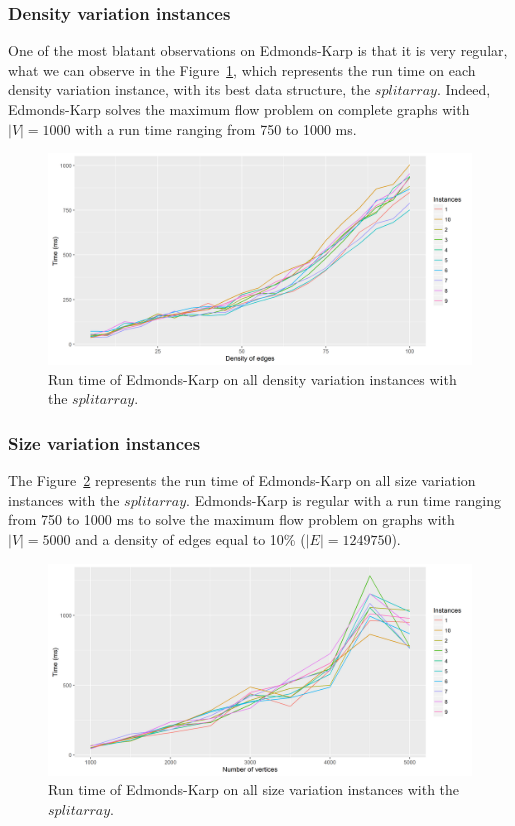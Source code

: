 \subsubsection{Density variation instances}
One of the most blatant observations on Edmonds-Karp is that it is very regular, what we can observe in the Figure~\ref{fig:EKmean}, which represents the run time on each density variation instance, with its best data structure, the $split array$. Indeed, Edmonds-Karp solves the maximum flow problem on complete graphs with $|V|=1000$ with a run time ranging from 750 to 1000 ms.
\begin{figure}[H]
\begin{center}
\includegraphics[scale=0.5]{images/results/EKmean.png}
\caption{Run time of Edmonds-Karp on all density variation instances with the $split array$.}
\label{fig:EKmean}
\end{center}
\end{figure}
\subsubsection{Size variation instances}
The Figure~\ref{fig:EKmeansize} represents the run time of Edmonds-Karp on all size variation instances with the $split array$. Edmonds-Karp is regular with a run time ranging from 750 to 1000 ms to solve the maximum flow problem on graphs with $|V|=5000$ and a density of edges equal to 10\% ($|E|=1249750$).
\begin{figure}[H]
\begin{center}
\includegraphics[scale=0.5]{images/results/EKmeansize2.png}
\caption{Run time of Edmonds-Karp on all size variation instances with the $split array$.}
\label{fig:EKmeansize}
\end{center}
\end{figure}

